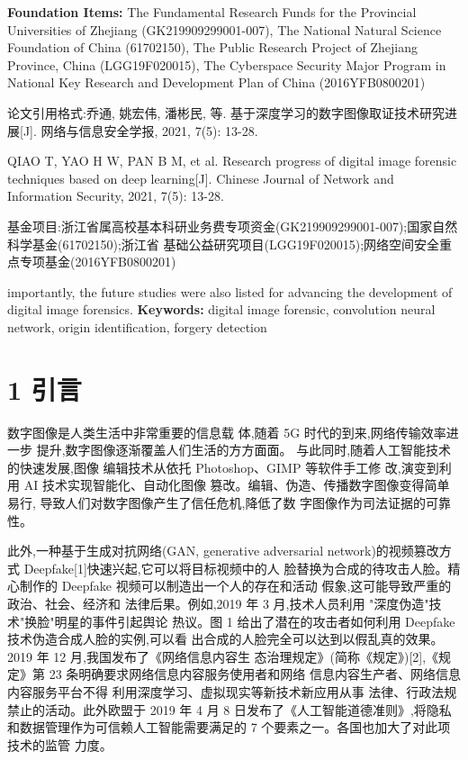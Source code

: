 \documentclass{article}
\begin{document}
\textbf{Foundation Items:} The Fundamental Research Funds for the Provincial Universities of Zhejiang (GK219909299001-007), The National Natural Science Foundation of China (61702150), The Public Research Project of Zhejiang Province, China (LGG19F020015), The Cyberspace Security Major Program in National Key Research and Development Plan of China (2016YFB0800201)

论文引用格式:乔通, 姚宏伟, 潘彬民, 等. 基于深度学习的数字图像取证技术研究进展[J]. 网络与信息安全学报, 2021, 7(5): 13-28.

QIAO T, YAO H W, PAN B M, et al. Research progress of digital image forensic techniques based on deep learning[J]. Chinese Journal of Network and Information Security, 2021, 7(5): 13-28.

基金项目:浙江省属高校基本科研业务费专项资金(GK219909299001-007);国家自然科学基金(61702150);浙江省 基础公益研究项目(LGG19F020015);网络空间安全重点专项基金(2016YFB0800201)

importantly, the future studies were also listed for advancing the development of digital image forensics. \textbf{Keywords:} digital image forensic, convolution neural network, origin identification, forgery detection

\section{1 引言}

数字图像是人类生活中非常重要的信息载 体,随着 5G 时代的到来,网络传输效率进一步 提升,数字图像逐渐覆盖人们生活的方方面面。 与此同时,随着人工智能技术的快速发展,图像 编辑技术从依托 Photoshop、GIMP 等软件手工修 改,演变到利用 AI 技术实现智能化、自动化图像 篡改。编辑、伪造、传播数字图像变得简单易行, 导致人们对数字图像产生了信任危机,降低了数 字图像作为司法证据的可靠性。

此外,一种基于生成对抗网络(GAN, generative adversarial network)的视频篡改方式 Deepfake[1]快速兴起,它可以将目标视频中的人 脸替换为合成的待攻击人脸。精心制作的 Deepfake 视频可以制造出一个人的存在和活动 假象,这可能导致严重的政治、社会、经济和 法律后果。例如,2019 年 3 月,技术人员利用 "深度伪造"技术"换脸"明星的事件引起舆论 热议。图 1 给出了潜在的攻击者如何利用 Deepfake 技术伪造合成人脸的实例,可以看 出合成的人脸完全可以达到以假乱真的效果。 2019 年 12 月,我国发布了《网络信息内容生 态治理规定》(简称《规定》)[2],《规定》第 23 条明确要求网络信息内容服务使用者和网络 信息内容生产者、网络信息内容服务平台不得 利用深度学习、虚拟现实等新技术新应用从事 法律、行政法规禁止的活动。此外欧盟于 2019 年 4 月 8 日发布了《人工智能道德准则》,将隐私 和数据管理作为可信赖人工智能需要满足的 7 个要素之一。各国也加大了对此项技术的监管 力度。
\end{document}
